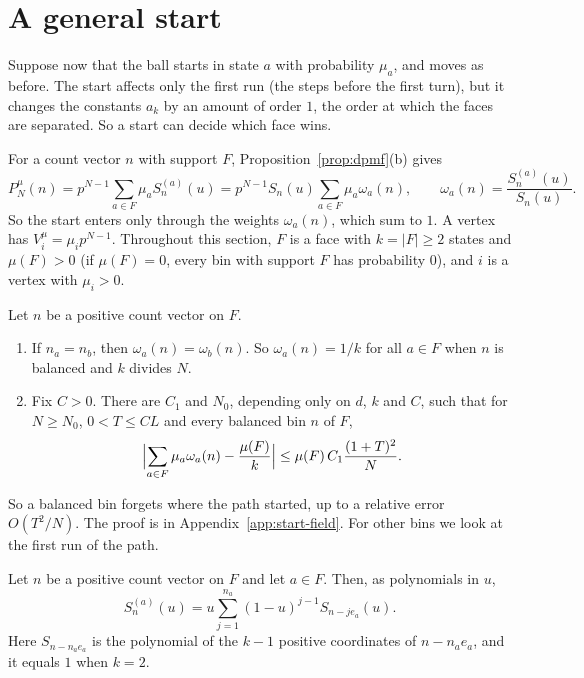 \section{A general start}\label{sec:general-start}

Suppose now that the ball starts in state $a$ with probability $\mu_a$, and
moves as before. The start affects only the first run (the steps before the
first turn), but it changes the
constants $a_k$ by an amount of order $1$, the order at which the faces are
separated. So a start can decide which face wins.

For a count vector $n$ with support $F$, Proposition~\ref{prop:dpmf}(b) gives
\[
 P^\mu_N(n)=p^{N-1}\sum_{a\in F}\mu_aS^{(a)}_n(u)
 =p^{N-1}S_n(u)\sum_{a\in F}\mu_a\omega_a(n),\qquad
 \omega_a(n)=\frac{S^{(a)}_n(u)}{S_n(u)}.
\]
So the start enters only through the weights $\omega_a(n)$, which sum to $1$. A
vertex has $V^\mu_i=\mu_ip^{N-1}$. Throughout this section, $F$ is a face with
$k=|F|\ge2$ states and $\mu(F)>0$ (if $\mu(F)=0$, every bin with support $F$ has
probability $0$), and $i$ is a vertex with $\mu_i>0$.

\begin{lemma}\label{lem:start-weights}
Let $n$ be a positive count vector on $F$.
\begin{enumerate}[(1)]
\item If $n_a=n_b$, then $\omega_a(n)=\omega_b(n)$. So $\omega_a(n)=1/k$ for
all $a\in F$ when $n$ is balanced and $k$ divides $N$.
\item Fix $C>0$. There are $C_1$ and $N_0$, depending only on $d$, $k$ and $C$,
such that for $N\ge N_0$, $0<T\le CL$ and every balanced bin $n$ of $F$,
\[
 \Bigl|\sum_{a\in F}\mu_a\omega_a(n)-\frac{\mu(F)}k\Bigr|
 \le\mu(F)\,C_1\frac{(1+T)^2}N.
\]
\end{enumerate}
\end{lemma}

So a balanced bin forgets where the path started, up to a relative error
$O(T^2/N)$. The proof is in Appendix~\ref{app:start-field}. For other bins we
look at the first run of the path.

\begin{lemma}\label{lem:first-run}
Let $n$ be a positive count vector on $F$ and let $a\in F$. Then, as
polynomials in $u$,
\[
 S^{(a)}_n(u)=u\sum_{j=1}^{n_a}(1-u)^{j-1}S_{n-je_a}(u).
\]
Here $S_{n-n_ae_a}$ is the polynomial of the $k-1$ positive coordinates of
$n-n_ae_a$, and it equals $1$ when $k=2$.
\end{lemma}

